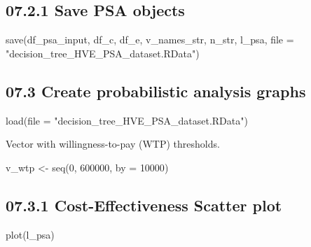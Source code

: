 \documentclass[
]{article}
\newenvironment{Shaded}{\begin{snugshade}}{\end{snugshade}}
\newcommand{\AttributeTok}[1]{\textcolor[rgb]{0.77,0.63,0.00}{#1}}
\newcommand{\DecValTok}[1]{\textcolor[rgb]{0.00,0.00,0.81}{#1}}
\newcommand{\FunctionTok}[1]{\textcolor[rgb]{0.00,0.00,0.00}{#1}}
\newcommand{\NormalTok}[1]{#1}
\newcommand{\OtherTok}[1]{\textcolor[rgb]{0.56,0.35,0.01}{#1}}
\newcommand{\StringTok}[1]{\textcolor[rgb]{0.31,0.60,0.02}{#1}}
\begin{document}
\hypertarget{save-psa-objects}{%
\subsection{07.2.1 Save PSA objects}\label{save-psa-objects}}

\begin{Shaded}
\begin{Highlighting}[]
\FunctionTok{save}\NormalTok{(df\_psa\_input, df\_c, df\_e, v\_names\_str, n\_str,}
\NormalTok{     l\_psa,}
     \AttributeTok{file =} \StringTok{"decision\_tree\_HVE\_PSA\_dataset.RData"}\NormalTok{)}
\end{Highlighting}
\end{Shaded}

\hypertarget{create-probabilistic-analysis-graphs}{%
\subsection{07.3 Create probabilistic analysis
graphs}\label{create-probabilistic-analysis-graphs}}

\begin{Shaded}
\begin{Highlighting}[]
\FunctionTok{load}\NormalTok{(}\AttributeTok{file =} \StringTok{"decision\_tree\_HVE\_PSA\_dataset.RData"}\NormalTok{)}
\end{Highlighting}
\end{Shaded}

Vector with willingness-to-pay (WTP) thresholds.

\begin{Shaded}
\begin{Highlighting}[]
\NormalTok{v\_wtp }\OtherTok{\textless{}{-}} \FunctionTok{seq}\NormalTok{(}\DecValTok{0}\NormalTok{, }\DecValTok{600000}\NormalTok{, }\AttributeTok{by =} \DecValTok{10000}\NormalTok{)}
\end{Highlighting}
\end{Shaded}

\hypertarget{cost-effectiveness-scatter-plot}{%
\subsection{07.3.1 Cost-Effectiveness Scatter
plot}\label{cost-effectiveness-scatter-plot}}

\begin{Shaded}
\begin{Highlighting}[]
\FunctionTok{plot}\NormalTok{(l\_psa)}
\end{Highlighting}
\end{Shaded}
\end{document}
